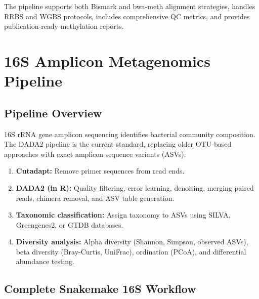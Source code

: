 \begin{tipbox}[title={Production Alternative: nf-core/methylseq}]
The  pipeline supports both Bismark and bwa-meth alignment strategies, handles RRBS and WGBS protocols, includes comprehensive QC metrics, and provides publication-ready methylation reports.
\end{tipbox}

\section{16S Amplicon Metagenomics Pipeline}
\label{sec:wf:16s}

\subsection{Pipeline Overview}

16S rRNA gene amplicon sequencing identifies bacterial community composition. The DADA2 pipeline is the current standard, replacing older OTU-based approaches with exact amplicon sequence variants (ASVs):

\begin{enumerate}[itemsep=2pt]
  \item \textbf{Cutadapt:} Remove primer sequences from read ends.
  \item \textbf{DADA2 (in R):} Quality filtering, error learning, denoising, merging paired reads, chimera removal, and ASV table generation.
  \item \textbf{Taxonomic classification:} Assign taxonomy to ASVs using SILVA, Greengenes2, or GTDB databases.
  \item \textbf{Diversity analysis:} Alpha diversity (Shannon, Simpson, observed ASVs), beta diversity (Bray-Curtis, UniFrac), ordination (PCoA), and differential abundance testing.
\end{enumerate}

\subsection{Complete Snakemake 16S Workflow}

